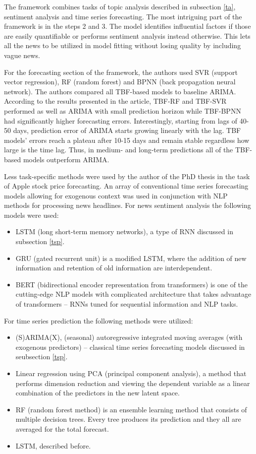 \documentclass[3p,times,procedia]{elsarticle}
\begin{document}
The framework combines tasks of topic analysis described in subsection \ref{ta}, sentiment analysis and time series forecasting. The most intriguing part of the framework is in the steps 2 and 3. The model identifies influential factors if those are easily quantifiable or performs sentiment analysis instead otherwise. This lets all the news to be utilized in model fitting without losing quality by including vague news.

\newpage

For the forecasting section of the framework, the authors used SVR (support vector regression), RF (random forest) and BPNN (back propagation neural network). The authors compared all TBF-based models to baseline ARIMA. According to the results presented in the article, TBF-RF and TBF-SVR performed as well as ARIMA with small prediction horizon while TBF-BPNN had significantly higher forecasting errors. Interestingly, starting from lags of 40-50 days, prediction error of ARIMA starts growing linearly with the lag. TBF models' errors reach a plateau after 10-15 days and remain stable regardless how large is the time lag. Thus, in medium- and long-term predictions all of the TBF-based models outperform ARIMA.

Less task-specific methods were used by the author of the PhD thesis \cite{jeong2022predicting} in the task of Apple stock price forecasting. An array of conventional time series forecasting models allowing for exogenous context was used in conjunction with NLP methods for processing news headlines. For news sentiment analysis the following models were used:
\begin{itemize}
	\item LSTM (long short-term memory networks), a type of RNN discussed in subsection \ref{tsp}.
	\item GRU (gated recurrent unit) is a modified LSTM, where the addition of new information and retention of old information are interdependent.
	\item BERT (bidirectional encoder representation from transformers) is one of the cutting-edge NLP models with complicated architecture that takes advantage of transformers -- RNNs tuned for sequential information and NLP tasks.
\end{itemize}

For time series prediction the following methods were utilized:
\begin{itemize}
	\item (S)ARIMA(X), (seasonal) autoregressive integrated moving averages (with exogenous predictors) -- classical time series forecasting models discussed in seubsection \ref{tsp}.
	\item Linear regression using PCA (principal component analysis), a method that performs dimension reduction and viewing the dependent variable as a linear combination of the predictors in the new latent space. 
	\item RF (random forest method) is an ensemble learning method that consists of multiple decision trees. Every tree produces its prediction and they all are averaged for the total forecast. 
	\item LSTM, described before.
\end{itemize}
\end{document}
